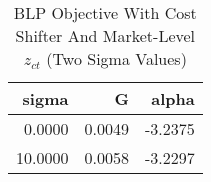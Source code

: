 \begin{table}[htbp]
    \centering
    \caption{BLP Objective With Cost Shifter And Market-Level $z_{ct}$ (Two Sigma Values)}
    \label{tab:q6_blp_costshifter_plus_z_G}
\begin{tabular}{rrr}
\toprule
sigma & G & alpha \\
\midrule
\midrule
0.0000 & 0.0049 & -3.2375 \\
10.0000 & 0.0058 & -3.2297 \\
\bottomrule
\bottomrule
\end{tabular}

\end{table}
